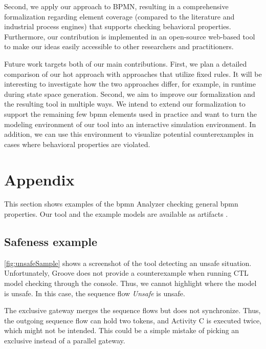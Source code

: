 \documentclass[runningheads]{llncs}
\begin{document}
Second, we apply our approach to BPMN, resulting in a comprehensive formalization regarding element coverage (compared to the literature and industrial process engines) that supports checking behavioral properties.
Furthermore, our contribution is implemented in an open-source web-based tool to make our ideas easily accessible to other researchers and practitioners.

Future work targets both of our main contributions.
First, we plan a detailed comparison of our \gls*{hot} approach with approaches that utilize fixed rules.
It will be interesting to investigate how the two approaches differ, for example, in runtime during state space generation.
Second, we aim to improve our formalization and the resulting tool in multiple ways.
We intend to extend our formalization to support the remaining few \gls*{bpmn} elements used in practice and want to turn the modeling environment of our tool into an interactive simulation environment.
In addition, we can use this environment to visualize potential counterexamples in cases where behavioral properties are violated.

 


\section{Appendix}


This section shows examples of the \gls*{bpmn} Analyzer checking general \gls*{bpmn} properties.
Our tool and the example models are available as artifacts \cite{krauterArtifactsICGT2023}.

\subsection{Safeness example}
\autoref{fig:unsafeSample} shows a screenshot of the tool detecting an unsafe situation.
Unfortunately, Groove does not provide a counterexample when running CTL model checking through the console.
Thus, we cannot highlight where the model is unsafe.
In this case, the sequence flow \textit{Unsafe} is unsafe.

The exclusive gateway merges the sequence flows but does not synchronize.
Thus, the outgoing sequence flow can hold two tokens, and Activity C is executed twice, which might not be intended.
This could be a simple mistake of picking an exclusive instead of a parallel gateway.
\end{document}
